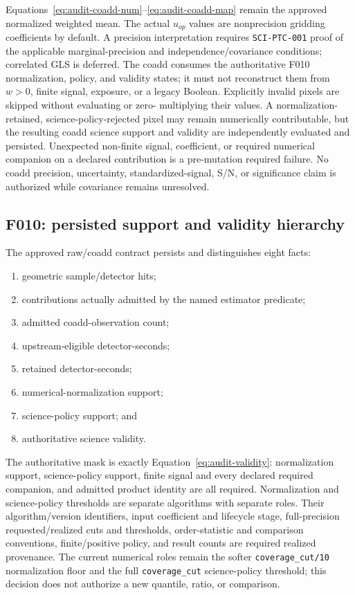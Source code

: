 \documentclass[11pt]{article}
\newcommand{\code}[1]{\nolinkurl{#1}}
\begin{document}
Equations~\eqref{eq:audit-coadd-num}--\eqref{eq:audit-coadd-map} remain the
approved normalized weighted mean.  The actual \(u_{op}\) values are
nonprecision gridding coefficients by default.  A precision interpretation
requires \code{SCI-PTC-001} proof of the applicable marginal-precision and
independence/covariance conditions; correlated GLS is deferred.  The coadd
consumes the authoritative F010 normalization, policy, and validity states; it
must not reconstruct them from \(w>0\), finite signal, exposure, or a legacy
Boolean.  Explicitly invalid pixels are skipped without evaluating or zero-
multiplying their values.  A normalization-retained, science-policy-rejected
pixel may remain numerically contributable, but the resulting coadd science
support and validity are independently evaluated and persisted.  Unexpected
non-finite signal, coefficient, or required numerical companion on a declared
contribution is a pre-mutation required failure.  No coadd precision,
uncertainty, standardized-signal, S/N, or significance claim is authorized
while covariance remains unresolved.

\subsection{F010: persisted support and validity hierarchy}

The approved raw/coadd contract persists and distinguishes eight facts:

\begin{enumerate}[leftmargin=*,label=\arabic*.]
\item geometric sample/detector hits;
\item contributions actually admitted by the named estimator predicate;
\item admitted coadd-observation count;
\item upstream-eligible detector-seconds;
\item retained detector-seconds;
\item numerical-normalization support;
\item science-policy support; and
\item authoritative science validity.
\end{enumerate}

The authoritative mask is exactly Equation~\eqref{eq:audit-validity}:
normalization support, science-policy support, finite signal and every declared
required companion, and admitted product identity are all required.
Normalization and science-policy thresholds are separate algorithms with
separate roles.  Their algorithm/version identifiers, input coefficient and
lifecycle stage, full-precision requested/realized cuts and thresholds,
order-statistic and comparison conventions, finite/positive policy, and
result counts are required realized provenance.  The current numerical roles
remain the softer \code{coverage_cut/10} normalization floor and the full
\code{coverage_cut} science-policy threshold; this decision does not authorize
a new quantile, ratio, or comparison.
\end{document}
